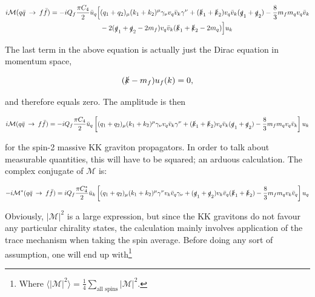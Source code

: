\documentclass[11pt,a4paper]{article}
\begin{document}
\begin{align}
	\begin{split}
	i\mathcal{M}(q\bar{q}\:\rightarrow\:f\bar{f}) = -iQ_f\frac{\pi C_4}{2}\bar{u}_q\Big[&(q_1 + q_2)_ \mu(k_1+k_2)^\mu \gamma_\nu v_q\bar{v}_k\gamma^\nu + (\slashed k_1 + \slashed k_2)v_q\bar{v}_k(\slashed q_1 + \slashed q_2) - \frac{8}{3}m_fm_qv_q\bar{v}_k\\
	&-2(\slashed q_1 + \slashed q_2 - 2m_f)v_q\bar{v}_k(\slashed k_1 + \slashed k_2 - 2m_q)\Big]u_k
	\end{split}
\end{align}

The last term in the above equation is actually just the Dirac equation in momentum space,

\begin{equation}
	(\slashed k - m_f)u_f(k) = 0,
\end{equation}

and therefore equals zero. The amplitude is then

\begin{equation}
	i\mathcal{M}(q\bar{q}\:\rightarrow\:f\bar{f}) = -iQ_f\frac{\pi C_4}{2}\bar{u}_q\left[(q_1 + q_2)_ \mu(k_1+k_2)^\mu \gamma_\nu v_q\bar{v}_k\gamma^\nu + (\slashed k_1 + \slashed k_2)v_q\bar{v}_k(\slashed q_1 + \slashed q_2) - \frac{8}{3}m_fm_qv_q\bar{v}_k\right]u_k
\end{equation}

for the spin-2 massive KK graviton propagators. In order to talk about measurable quantities, this will have to be squared; an arduous calculation. The complex conjugate of $\mathcal{M}$ is:

\begin{equation}
	-i\mathcal{M}^*(q\bar{q}\:\rightarrow\:f\bar{f}) = iQ_f\frac{\pi C_4^*}{2}\bar{u}_k\left[(q_1 + q_2)_ \mu(k_1+k_2)^\mu \gamma^\nu v_k\bar{v}_q\gamma_\nu + (\slashed q_1 + \slashed q_2)v_k\bar{v}_q(\slashed k_1 + \slashed k_2) - \frac{8}{3}m_fm_qv_k\bar{v}_q\right]u_q
\end{equation}

Obviously, $|\mathcal{M}|^2$ is a large expression, but since the KK gravitons do not favour any particular chirality states, the calculation mainly involves application of the trace mechanism when taking the spin average. Before doing any sort of assumption, one will end up with\footnote{Where $\langle|\mathcal{M}|^2\rangle = \frac{1}{4}\sum_{\text{all spins}}|\mathcal{M}|^2$.}
\end{document}

